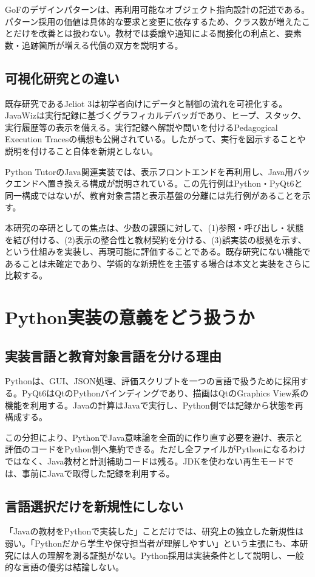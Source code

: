 \documentclass[a4paper,11pt]{ltjsarticle}
\newcommand{\code}[1]{\texttt{\detokenize{#1}}}
\begin{document}
GoFのデザインパターンは、再利用可能なオブジェクト指向設計の記述である\cite{gof}。パターン採用の価値は具体的な要求と変更に依存するため、クラス数が増えたことだけを改善とは扱わない。教材では委譲や通知による間接化の利点と、要素数・追跡箇所が増える代償の双方を説明する。

\subsection{可視化研究との違い}
既存研究であるJeliot 3は初学者向けにデータと制御の流れを可視化する\cite{jeliot}。JavaWizは実行記録に基づくグラフィカルデバッガであり、ヒープ、スタック、実行履歴等の表示を備える\cite{javawiz}。実行記録へ解説や問いを付けるPedagogical Execution Tracesの構想も公開されている\cite{pets}。したがって、実行を図示することや説明を付けること自体を新規としない。

Python TutorのJava関連実装\code{java_visualize}では、表示フロントエンドを再利用し、Java用バックエンドへ置き換える構成が説明されている\cite{javavis}。この先行例はPython・PyQt6と同一構成ではないが、教育対象言語と表示基盤の分離には先行例があることを示す。

本研究の卒研としての焦点は、少数の課題に対して、(1)参照・呼び出し・状態を結び付ける、(2)表示の整合性と教材契約を分ける、(3)誤実装の根拠を示す、という仕組みを実装し、再現可能に評価することである。既存研究にない機能であることは未確定であり、学術的な新規性を主張する場合は本文と実装をさらに比較する。
\clearpage

\section{Python実装の意義をどう扱うか}
\subsection{実装言語と教育対象言語を分ける理由}
Pythonは、GUI、JSON処理、評価スクリプトを一つの言語で扱うために採用する。PyQt6はQtのPythonバインディングであり\cite{pyqt}、描画はQtのGraphics View系の機能を利用する\cite{qgraphics}。Javaの計算はJavaで実行し、Python側では記録から状態を再構成する。

この分担により、PythonでJava意味論を全面的に作り直す必要を避け、表示と評価のコードをPython側へ集約できる。ただし全ファイルがPythonになるわけではなく、Java教材と計測補助コードは残る。JDKを使わない再生モードでは、事前にJavaで取得した記録を利用する。

\subsection{言語選択だけを新規性にしない}
「Javaの教材をPythonで実装した」ことだけでは、研究上の独立した新規性は弱い。「Pythonだから学生や保守担当者が理解しやすい」という主張にも、本研究には人の理解を測る証拠がない。Python採用は実装条件として説明し、一般的な言語の優劣は結論しない。
\end{document}
